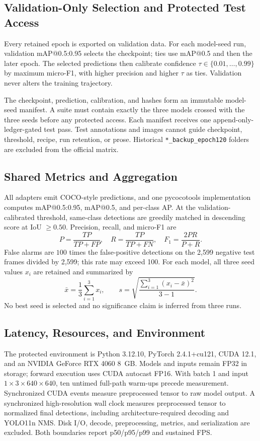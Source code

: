 \documentclass[conference]{IEEEtran}
\begin{document}
\subsection{Validation-Only Selection and Protected Test Access}
Every retained epoch is exported on validation data. For each model-seed run, validation mAP@0.5:0.95 selects the checkpoint; ties use mAP@0.5 and then the later epoch. The selected predictions then calibrate confidence $\tau\in\{0.01,\ldots,0.99\}$ by maximum micro-F1, with higher precision and higher $\tau$ as ties. Validation never alters the training trajectory.

The checkpoint, prediction, calibration, and hashes form an immutable model-seed manifest. A suite must contain exactly the three models crossed with the three seeds before any protected access. Each manifest receives one append-only-ledger-gated test pass. Test annotations and images cannot guide checkpoint, threshold, recipe, run retention, or prose. Historical \texttt{*\_backup\_epoch120} folders are excluded from the official matrix.

\subsection{Shared Metrics and Aggregation}
All adapters emit COCO-style predictions, and one pycocotools implementation \cite{lin2014coco} computes mAP@0.5:0.95, mAP@0.5, and per-class AP. At the validation-calibrated threshold, same-class detections are greedily matched in descending score at IoU $\geq0.50$. Precision, recall, and micro-F1 are
\begin{equation}
P=\frac{TP}{TP+FP},\quad R=\frac{TP}{TP+FN},\quad F_1=\frac{2PR}{P+R}.
\end{equation}
False alarms are $100$ times the false-positive detections on the 2,599 negative test frames divided by 2,599; this rate may exceed 100. For each model, all three seed values $x_i$ are retained and summarized by
\begin{equation}
\bar{x}=\frac{1}{3}\sum_{i=1}^{3}x_i,\qquad s=\sqrt{\frac{\sum_{i=1}^{3}(x_i-\bar{x})^2}{3-1}}.
\end{equation}
No best seed is selected and no significance claim is inferred from three runs.

\subsection{Latency, Resources, and Environment}
The protected environment is Python 3.12.10, PyTorch 2.4.1+cu121, CUDA 12.1, and an NVIDIA GeForce RTX 4060 8~GB. Models and inputs remain FP32 in storage; forward execution uses CUDA autocast FP16. With batch 1 and input $1\times3\times640\times640$, ten untimed full-path warm-ups precede measurement. Synchronized CUDA events measure preprocessed tensor to raw model output. A synchronized high-resolution wall clock measures preprocessed tensor to normalized final detections, including architecture-required decoding and YOLO11n NMS. Disk I/O, decode, preprocessing, metrics, and serialization are excluded. Both boundaries report p50/p95/p99 and sustained FPS.
\end{document}
